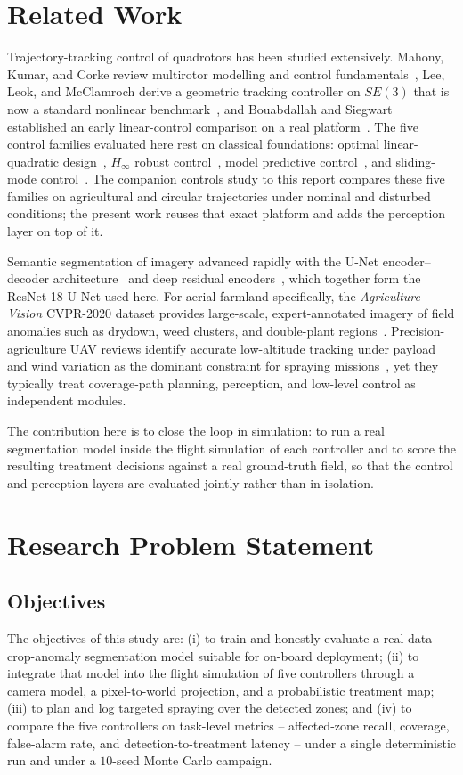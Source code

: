 \documentclass[12pt,a4paper]{article}
\begin{document}
\section{Related Work}\label{sec:related}
Trajectory-tracking control of quadrotors has been studied extensively. Mahony,
Kumar, and Corke review multirotor modelling and control fundamentals~\cite{mahony2012},
Lee, Leok, and McClamroch derive a geometric tracking controller on $SE(3)$ that is now
a standard nonlinear benchmark~\cite{lee2010}, and Bouabdallah and Siegwart established
an early linear-control comparison on a real platform~\cite{bouabdallah2007}. The five
control families evaluated here rest on classical foundations: optimal linear-quadratic
design~\cite{anderson2007}, $H_\infty$ robust control~\cite{zhou1996}, model predictive
control~\cite{rawlings2017}, and sliding-mode control~\cite{utkin1992}. The companion
controls study to this report compares these five families on agricultural and circular
trajectories under nominal and disturbed conditions; the present work reuses that exact
platform and adds the perception layer on top of it.

Semantic segmentation of imagery advanced rapidly with the U-Net encoder--decoder
architecture~\cite{ronneberger2015} and deep residual encoders~\cite{he2016}, which
together form the ResNet-18 U-Net used here. For aerial farmland specifically, the
\emph{Agriculture-Vision} CVPR-2020 dataset provides large-scale, expert-annotated
imagery of field anomalies such as drydown, weed clusters, and double-plant
regions~\cite{chiu2020}. Precision-agriculture UAV reviews identify accurate
low-altitude tracking under payload and wind variation as the dominant constraint for
spraying missions~\cite{huang2013,zhang2021}, yet they typically treat coverage-path
planning, perception, and low-level control as independent modules.

The contribution here is to close the loop in simulation: to run a real segmentation
model inside the flight simulation of each controller and to score the resulting
treatment decisions against a real ground-truth field, so that the control and
perception layers are evaluated jointly rather than in isolation.

\section{Research Problem Statement}\label{sec:problem}

\subsection{Objectives}
The objectives of this study are: (i) to train and honestly evaluate a real-data
crop-anomaly segmentation model suitable for on-board deployment; (ii) to integrate
that model into the flight simulation of five controllers through a camera model, a
pixel-to-world projection, and a probabilistic treatment map; (iii) to plan and log
targeted spraying over the detected zones; and (iv) to compare the five controllers
on task-level metrics -- affected-zone recall, coverage, false-alarm rate, and
detection-to-treatment latency -- under a single deterministic run and under a
$10$-seed Monte Carlo campaign.
\end{document}
